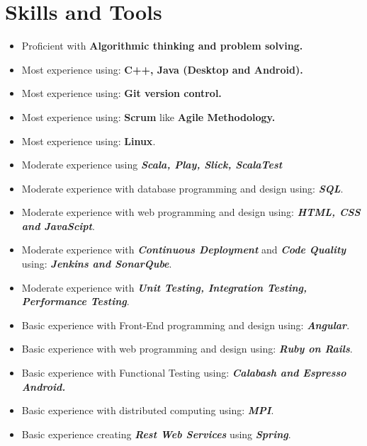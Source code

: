 \documentclass[a4paper,10pt]{article} %
\begin{document}

\section{Skills and Tools}
\begin{itemize}
 \item Proficient with \textbf{Algorithmic thinking and problem solving.}
 \item Most experience using: \textbf{C++, Java (Desktop and Android).}
 \item Most experience using: \textbf{Git version control.}
 \item Most experience using: \textbf{Scrum} like \textbf{Agile Methodology.}
 \item Most experience using: \textbf{Linux}.
 \item Moderate experience using {\sl \textbf{Scala, Play, Slick, ScalaTest}}
 \item Moderate experience with database programming and design using: {\sl \textbf{SQL}}.
 \item Moderate experience with web programming and design using: {\sl \textbf{HTML, CSS and JavaScipt}}.
 \item Moderate experience with {\sl \textbf{Continuous Deployment}} and {\sl \textbf{Code Quality}} using: {\sl \textbf{Jenkins and SonarQube}}.
 \item Moderate experience with {\sl \textbf{Unit Testing, Integration Testing, Performance Testing}}.
 \item Basic experience with Front-End programming and design using: {\sl \textbf{Angular}}.
 \item Basic experience with web programming and design using: {\sl \textbf{Ruby on Rails}}.
 \item Basic experience with Functional Testing using: {\sl \textbf{Calabash and Espresso Android.}}
 \item Basic experience with distributed computing using: {\sl \textbf{MPI}}.
 \item Basic experience creating {\sl \textbf{Rest Web Services}} using {\sl \textbf{Spring}}.
\end{itemize}

\end{document}
